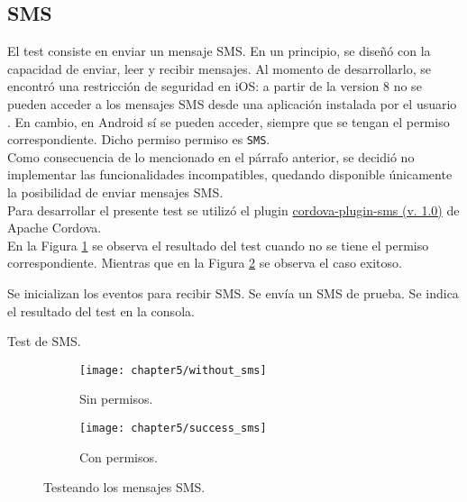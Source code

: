 \subsection{SMS}
El test consiste en enviar un mensaje SMS. En un principio, se diseñó con la capacidad de enviar, leer y recibir mensajes. Al momento de desarrollarlo, se encontró una restricción de seguridad en iOS: a partir de la version 8 no se pueden acceder a los mensajes SMS desde una aplicación instalada por el usuario \cite{foda, foda2}. En cambio, en Android sí se pueden acceder, siempre que se tengan el permiso correspondiente. Dicho permiso permiso es \texttt{SMS}.\\
Como consecuencia de lo mencionado en el párrafo anterior, se decidió no implementar las funcionalidades incompatibles, quedando disponible únicamente la posibilidad de enviar mensajes SMS.\\
Para desarrollar el presente test se utilizó el plugin \href{https://github.com/floatinghotpot/cordova-plugin-sms}{cordova-plugin-sms (v. 1.0)} de Apache Cordova.\\
En la Figura \ref{fig:ch05:without_sms} se observa el resultado del test cuando no se tiene el permiso correspondiente. Mientras que en la Figura \ref{fig:ch05:with_sms} se observa el caso exitoso.
\begin{algorithm}
	\begin{algorithmic}[1]
		\STATE Se inicializan los eventos para recibir SMS. 
		\STATE Se envía un SMS de prueba.
		\STATE Se indica el resultado del test en la consola.
	\end{algorithmic}
	\caption{Test de SMS.}
	\label{alg:chap5_test_sms}
\end{algorithm}
\begin{figure}[hbtp]
    \centering
	\begin{subfigure}{.3\linewidth}
		\texttt{[image: chapter5/without\_sms]}
		\caption{Sin permisos.}
		\label{fig:ch05:without_sms}
	\end{subfigure}
	\begin{subfigure}{.3\linewidth}
	    \centering
		\texttt{[image: chapter5/success\_sms]}
		\caption{Con permisos.}
		\label{fig:ch05:with_sms}
	\end{subfigure}
	\caption{Testeando los mensajes SMS.}
	\label{fig:chapter05:sms_test}
\end{figure}
